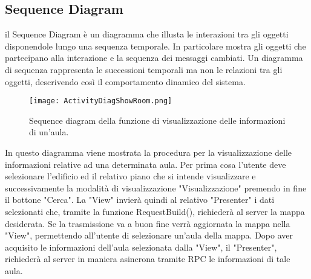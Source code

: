 \FloatBarrier
\subsection*{Sequence Diagram}
il Sequence Diagram è un diagramma che illusta le interazioni tra gli oggetti disponendole lungo una sequenza temporale. In particolare mostra gli oggetti che partecipano alla interazione e la sequenza dei messaggi cambiati.
Un diagramma di sequenza rappresenta le successioni temporali ma non le relazioni tra gli oggetti, descrivendo così il comportamento dinamico del sistema.
\begin{figure}[!htb]
\centering%
\texttt{[image: ActivityDiagShowRoom.png]}%
\caption{Sequence diagram della funzione di visualizzazione delle informazioni di un'aula.}\label{fig:umlSeqDRoomInfo}%
\end{figure}
In questo diagramma viene mostrata la procedura per la visualizzazione delle informazioni relative ad una determinata aula. Per prima cosa l'utente deve selezionare l'edificio ed il relativo piano che si intende visualizzare e successivamente la modalità di visualizzazione "Visualizzazione" premendo in fine il bottone "Cerca". La "View" invierà quindi al relativo "Presenter" i dati selezionati che, tramite la funzione RequestBuild(), richiederà al server la mappa desiderata. Se la trasmissione va a buon fine verrà aggiornata la mappa nella "View", permettendo all'utente di selezionare un'aula  della mappa. Dopo aver acquisito le informazioni dell'aula selezionata dalla "View", il "Presenter", richiederà al server in maniera asincrona tramite RPC le informazioni di tale aula.